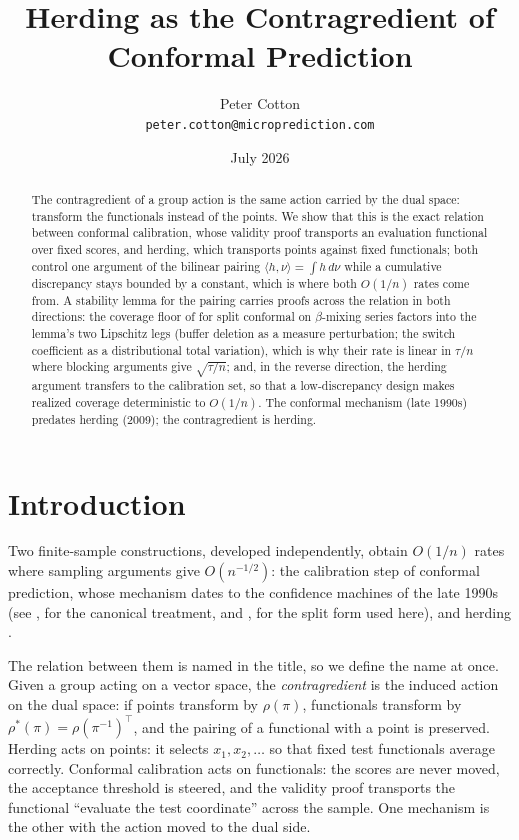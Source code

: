 \documentclass[11pt]{article}
\title{Herding as the Contragredient of Conformal Prediction}
\author{Peter Cotton\\\texttt{peter.cotton@microprediction.com}}
\date{July 2026}
\theoremstyle{remark}
\begin{document}
\maketitle

\begin{abstract}
The contragredient of a group action is the same action carried by the dual space: transform the
functionals instead of the points. We show that this is the exact relation between conformal
calibration, whose validity proof transports an evaluation functional over fixed scores, and
herding, which transports points against fixed functionals; both control one argument of the
bilinear pairing $\langle h,\nu\rangle=\int h\,d\nu$ while a cumulative discrepancy stays bounded
by a constant, which is where both $O(1/n)$ rates come from. A stability lemma for the pairing carries proofs across the relation in both directions: the coverage floor of \citet{barberpananjady2026} for split conformal on $\beta$-mixing
series factors into the lemma's two Lipschitz legs (buffer deletion as a measure perturbation; the switch coefficient as a distributional total variation), which is why their rate is linear
in $\tau/n$ where blocking arguments give $\sqrt{\tau/n}$; and, in the reverse direction, the
herding argument transfers to the calibration set, so that a low-discrepancy design makes
realized coverage deterministic to $O(1/n)$. The conformal mechanism (late 1990s) predates
herding (2009); the contragredient is herding.
\end{abstract}

\section{Introduction}

Two finite-sample constructions, developed independently, obtain $O(1/n)$ rates where sampling
arguments give $O(n^{-1/2})$: the calibration step of conformal prediction, whose mechanism dates
to the confidence machines of the late 1990s (see \citealp{vovk2005}, for the canonical
treatment, and \citealp{lei2018}, for the split form used here), and herding
\citep{welling2009}.

The relation between them is named in the title, so we define the name at once. Given a group
acting on a vector space, the \emph{contragredient} is the induced action on the dual space: if
points transform by $\rho(\pi)$, functionals transform by $\rho^{*}(\pi)=\rho(\pi^{-1})^{\top}$,
and the pairing of a functional with a point is preserved. Herding acts on points: it selects
$x_1,x_2,\dots$ so that fixed test functionals average correctly. Conformal calibration acts on
functionals: the scores are never moved, the acceptance threshold is steered, and the validity
proof transports the functional ``evaluate the test coordinate'' across the sample. One mechanism
is the other with the action moved to the dual side.
\end{document}
